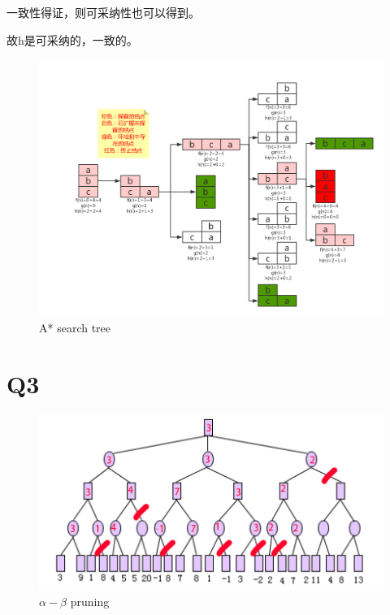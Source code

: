 \documentclass[a4paper, 11pt]{article}
\begin{document}
	一致性得证，则可采纳性也可以得到。

	故h是可采纳的，一致的。

    \newpage

    \begin{figure}
      \centering
      \includegraphics[width=15cm]{4.png}
      \caption{A* search tree}
    \end{figure}


\section{Q3}
\begin{figure}
  \centering
  \includegraphics[width=15cm]{3.jpg}
  \caption{$\alpha-\beta$ pruning}
\end{figure}

%
%
\end{document}
